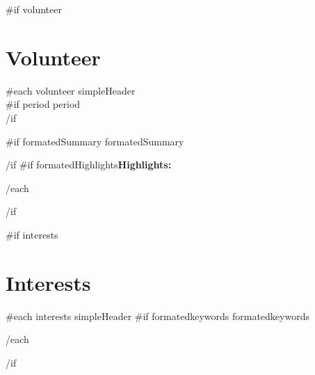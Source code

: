 \documentclass{article}
\begin{document}
{{#if volunteer}}\section*{Volunteer} {
  {{#each volunteer}}
    {{ simpleHeader }}\\
    {{#if period}}{{ period }}\\{{/if}}
    \par
    {{#if formatedSummary}}
      {{ formatedSummary }}
      \par
    {{/if}}
    {{#if formatedHighlights}}\bfseries Highlights: 
    \par
  {{/each}}
}{{/if}}

{{#if interests}}\section*{Interests}{
  {{#each interests}}
    {{ simpleHeader }}\newline
    {{#if formatedkeywords}}{{ formatedkeywords }}
    \par
  {{/each}}
}{{/if}}
\end{document}
